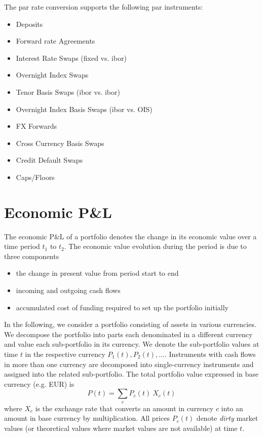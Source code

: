 The par rate conversion supports the following par instruments:
\begin{itemize}
\item Deposits
\item Forward rate Agreements
\item Interest Rate Swaps (fixed vs. ibor)
\item Overnight Index Swaps
\item Tenor Basis Swaps (ibor vs. ibor)
\item Overnight Index Basis Swaps (ibor vs. OIS)
\item FX Forwards
\item Cross Currency Basis Swaps
\item Credit Default Swaps
\item Caps/Floors
\end{itemize}


\section{Economic P\&L}\label{economic_pnl}

The economic P\&L of a portfolio denotes the change in its economic value over
a time period $t_1$ to $t_2$. The economic value evolution during the period is due to three components

\begin{itemize}
\item the change in present value from period start to end
\item incoming and outgoing cash flows
\item accumulated cost of funding required to set up the portfolio initially
\end{itemize}

In the following, we consider a portfolio consisting of assets in various currencies. We decompose the portfolio into parts each denominated in a different currency and value each sub-portfolio in its currency. We denote the sub-portfolio values at time $t$ in the respective currency $P_1(t), P_2(t), \dots$. Instruments with cash flows in more than one currency are decomposed into single-currency instruments and assigned into the related sub-portfolio.
The total portfolio value expressed in base currency (e.g. EUR) is
\begin{equation}
	P(t) = \sum_c P_c(t)\:X_c(t) \label{initial_value_base}
\end{equation}
where $X_c$ is the exchange rate that converts an amount in currency $c$ into an amount in base currency by multiplication. All prices $P_c(t)$ denote {\em dirty} market values (or theoretical values where market values are not available) at time $t$.

